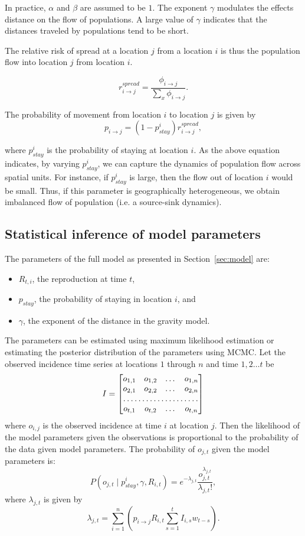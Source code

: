 \documentclass[11pt,]{article}
\begin{document}
In practice, \( \alpha \) and \( \beta \) are assumed to be $1$. The
exponent \( \gamma \) modulates the effects distance on the flow of
populations. A large value of \( \gamma \) indicates that the
distances traveled by populations tend to be short.

The relative risk of spread at a location \(j\) from a location \(i\)
is thus the population flow into location \(j\) from location \(i\).

\[
  r_{i \rightarrow j}^{spread} = \frac{\phi_{i \rightarrow
  j}}{\sum_{x}{\phi_{i \rightarrow
  j}}}.
\]

The probability of movement from location \(i\) to location \(j\) is given by
\[  p_{i \rightarrow j} = (1 - p_{stay}^i) r_{i \rightarrow j}^{spread},\]

where \(p_{stay}^i\) is the probability of staying at location
\(i\). As the above equation indicates, by varying $p_{stay}^i$, we
can capture the dynamics of population flow across spatial units. For
instance, if \(p_{stay}^i\) is large, then the flow out of location
\(i\) would be small. Thus, if this parameter is geographically
heterogeneous, we obtain imbalanced flow of population (i.e. a source-sink dynamics). 

\subsection{Statistical inference of model parameters}

The parameters of the full model as presented in Section~\ref{sec:model} are: 
\begin{itemize}
\item $R_{t, i}$, the reproduction at time $t$,
\item $p_{stay}$, the probability of staying in location $i$, and 
\item $\gamma$, the exponent of the distance in the gravity model. 
\end{itemize}


The parameters can be estimated using maximum likelihood
estimation or estimating the posterior distribution of the parameters using
MCMC. Let the observed incidence time series at locations \(1\)
through \(n\) and time \(1, 2 \dots t\) be
\[
I = \begin{bmatrix}
    o_{1,1}       & o_{1,2}  & \dots & o_{1,n} \\
    o_{2,1}       & o_{2,2}  & \dots & o_{2,n} \\
    \hdotsfor{4} \\
    o_{t,1}       & o_{t,2}  & \dots & o_{t,n}
\end{bmatrix}
\]
where \(o_{i, j}\) is the observed incidence at time \(i\) at location
\(j\).
Then the likelihood of the model parameters given the
observations is proportional to the probability of the data given
model parameters.  The probability of $o_{j, t}$ given
the model parameters is:
\[ P(o_{j, t} \mid p_{stay}^i, \gamma, R_{i, t}) = e^{-\lambda_{j, t}}
  \frac{o_{j, t}^{\lambda_{j, t}}}{\lambda_{j, t} !}, \]
where $\lambda_{j, t}$ is given by
\[
  \lambda_{j, t} = \sum_{i = 1}^n{\left(p_{i \rightarrow j}R_{i, t} \sum_{s
        = 1}^t{I_{i, s}w_{t - s}} \right)}.\]
\end{document}

